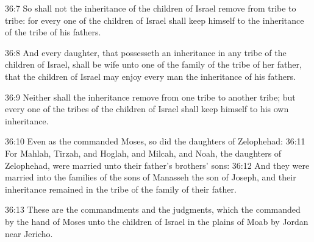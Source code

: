 36:7 So shall not the inheritance of the children of Israel remove
from tribe to tribe: for every one of the children of Israel shall
keep himself to the inheritance of the tribe of his fathers.

36:8 And every daughter, that possesseth an inheritance in any tribe
of the children of Israel, shall be wife unto one of the family of the
tribe of her father, that the children of Israel may enjoy every man
the inheritance of his fathers.

36:9 Neither shall the inheritance remove from one tribe to another
tribe; but every one of the tribes of the children of Israel shall
keep himself to his own inheritance.

36:10 Even as the \LORD commanded Moses, so did the daughters of
Zelophehad: 36:11 For Mahlah, Tirzah, and Hoglah, and Milcah, and
Noah, the daughters of Zelophehad, were married unto their father's
brothers' sons: 36:12 And they were married into the families of the
sons of Manasseh the son of Joseph, and their inheritance remained in
the tribe of the family of their father.

36:13 These are the commandments and the judgments, which the \LORD
commanded by the hand of Moses unto the children of Israel in the
plains of Moab by Jordan near Jericho.

